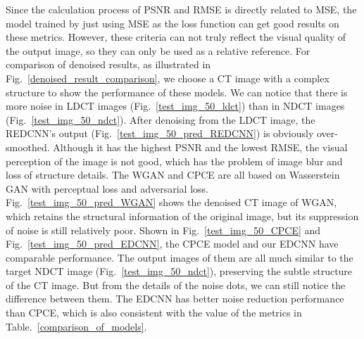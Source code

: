 \documentclass[conference]{IEEEtran}
\begin{document}
            Since the calculation process of PSNR and RMSE is directly related to MSE, the model trained by just using MSE as the loss function can get good results on these metrics.
            However, these criteria can not truly reflect the visual quality of the output image, so they can only be used as a relative reference.
            For comparison of denoised results, as illustrated in Fig.~\ref{denoised_result_comparison}, we choose a CT image with a complex structure to show the performance of these models.
            We can notice that there is more noise in LDCT images (Fig.~\ref{test_img_50_ldct}) than in NDCT images (Fig.~\ref{test_img_50_ndct}).
            After denoising from the LDCT image, the REDCNN's output (Fig.~\ref{test_img_50_pred_REDCNN}) is obviously over-smoothed.
            Although it has the highest PSNR and the lowest RMSE, the visual perception of the image is not good, which has the problem of image blur and loss of structure details.
            The WGAN and CPCE are all based on Wasserstein GAN with perceptual loss and adversarial loss.
            Fig.~\ref{test_img_50_pred_WGAN} shows the denoised CT image of WGAN, which retains the structural information of the original image, but its suppression of noise is still relatively poor.
            Shown in Fig.~\ref{test_img_50_CPCE} and Fig.~\ref{test_img_50_pred_EDCNN}, the CPCE model and our EDCNN have comparable performance.
            The output images of them are all much similar to the target NDCT image (Fig.~\ref{test_img_50_ndct}), preserving the subtle structure of the CT image.
            But from the details of the noise dots, we can still notice the difference between them.
            The EDCNN has better noise reduction performance than CPCE, which is also consistent with the value of the metrics in Table.~\ref{comparison_of_models}.
\end{document}
